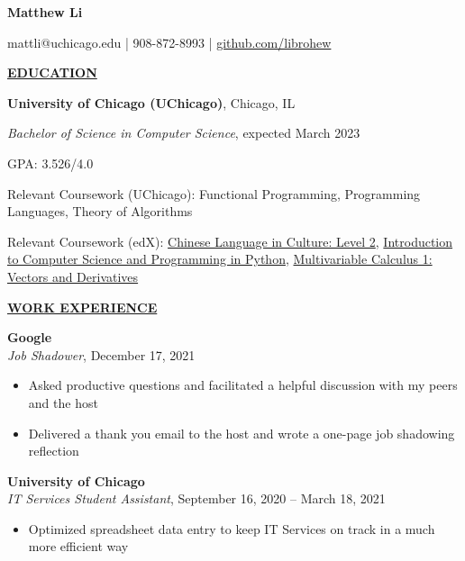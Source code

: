 \documentclass[
]{article}
\author{}
\date{\vspace{-2.5em}}
\providecommand{\tightlist}{%
  \setlength{\itemsep}{0pt}\setlength{\parskip}{0pt}}
\begin{document}

\begin{center}

\textbf{Matthew Li}

\end{center}

\begin{center}
mattli@uchicago.edu | 908-872-8993 | \href{https://www.github.com/librohew}{github.com/librohew}   
\end{center}

\textbf{\underline{EDUCATION}}

\textbf{University of Chicago (UChicago)}, Chicago, IL

\emph{Bachelor of Science in Computer Science}, expected March 2023

GPA: 3.526/4.0

Relevant Coursework (UChicago): Functional Programming, %
Programming Languages, %
Theory of Algorithms

Relevant Coursework (edX): \href{https://courses.edx.org/certificates/dfd4b97d29cd408a985d6453a40d5424}{Chinese Language in Culture: Level 2}, \href{https://courses.edx.org/certificates/6b651e19ead94fcab76c5acb0e125f86}{Introduction to Computer Science and Programming in Python}, \href{https://courses.edx.org/certificates/427a45b7df034c2a9fb085b0993bdec0}{Multivariable Calculus 1: Vectors and Derivatives}

\textbf{\underline{WORK EXPERIENCE}}

\textbf{Google}\\
\emph{Job Shadower}, December 17, 2021

\begin{itemize}
\tightlist
\item
  Asked productive questions and facilitated a helpful discussion with my peers and the host
\end{itemize}

\begin{itemize}
\item
  Delivered a thank you email to the host and wrote a one-page job shadowing reflection  
\end{itemize}

\textbf{University of Chicago}\\
\emph{IT Services Student Assistant}, September 16, 2020 -- March 18,
2021

\begin{itemize}
\tightlist
\item
  Optimized spreadsheet data entry to keep IT Services on track in a
  much more efficient way
\end{itemize}
\end{document}
